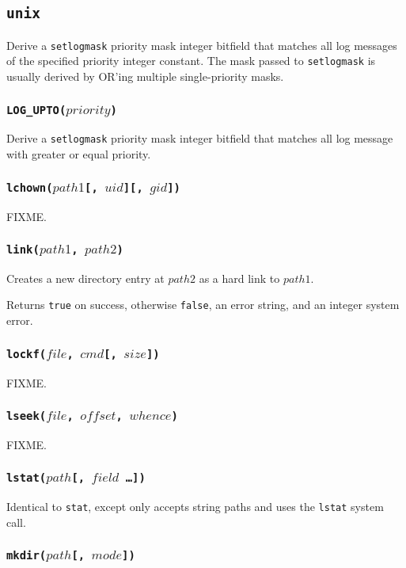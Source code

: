 \documentclass[11pt, oneside]{memoir}
\newcommand*{\true}[0]{\texttt{true}\xspace}
\newcommand*{\false}[0]{\texttt{false}\xspace}
\newcommand*{\syscall}[1]{\texttt{#1}\xspace}
\newcommand*{\fn}[1]{\texttt{#1}\xspace}
\newcounter{toccols}
\newenvironment{Module}[1]{
	\subsection{\texttt{#1}}
	\addtocontents{toc}{
		\protect\begin{multicols}{\value{toccols}}
	}
}{
	\addtocontents{toc}{\protect\end{multicols}}
}
\begin{document}
\begin{Module}{unix}
Derive a \fn{setlogmask} priority mask integer bitfield that matches all log messages of the specified priority integer constant. The mask passed to \fn{setlogmask} is usually derived by OR'ing multiple single-priority masks.

\subsubsection[\fn{LOG\_UPTO}]{\fn{LOG\_UPTO($priority$)}}

Derive a \fn{setlogmask} priority mask integer bitfield that matches all log message with greater or equal priority.

\subsubsection[\fn{lchown}]{\fn{lchown($path1$[, $uid$][, $gid$])}}

FIXME.

\subsubsection[\fn{link}]{\fn{link($path1$, $path2$)}}

Creates a new directory entry at $path2$ as a hard link to $path1$.

Returns \true on success, otherwise \false, an error string, and an integer system error. 

\subsubsection[\fn{lockf}]{\fn{lockf($file$, $cmd$[, $size$])}}

FIXME.

\subsubsection[\fn{lseek}]{\fn{lseek($file$, $offset$, $whence$)}}

FIXME.

\subsubsection[\fn{lstat}]{\fn{lstat($path$[, $field$ \ldots])}}

Identical to \fn{stat}, except only accepts string paths and uses the \syscall{lstat} system call.

\subsubsection[\fn{mkdir}]{\fn{mkdir($path$[, $mode$])}}


\end{Module}
\end{document}
